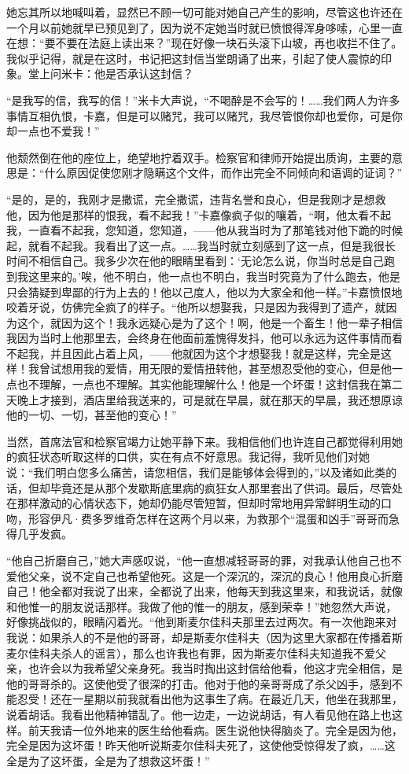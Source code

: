 \par 她忘其所以地喊叫着，显然已不顾一切可能对她自己产生的影响，尽管这也许还在一个月以前她就早已预见到了，因为说不定她当时就已愤恨得浑身哆嗦，心里一直在想：“要不要在法庭上读出来？”现在好像一块石头滚下山坡，再也收拦不住了。我似乎记得，就是在这时，书记把这封信当堂朗诵了出来，引起了使人震惊的印象。堂上问米卡：他是否承认这封信？
\par “是我写的信，我写的信！”米卡大声说，“不喝醉是不会写的！……我们两人为许多事情互相仇恨，卡嘉，但是可以赌咒，我可以赌咒，我尽管恨你却也爱你，可是你却一点也不爱我！”
\par 他颓然倒在他的座位上，绝望地拧着双手。检察官和律师开始提出质询，主要的意思是：“什么原因促使您刚才隐瞒这个文件，而作出完全不同倾向和语调的证词？”
\par “是的，是的，我刚才是撒谎，完全撒谎，违背名誉和良心，但是我刚才是想救他，因为他是那样的恨我，看不起我！”卡嘉像疯子似的嚷着，“啊，他太看不起我，一直看不起我，您知道，您知道，——他从我当时为了那笔钱对他下跪的时候起，就看不起我。我看出了这一点。……我当时就立刻感到了这一点，但是我很长时间不相信自己。我多少次在他的眼睛里看到：‘无论怎么说，你当时总是自己跑到我这里来的。’唉，他不明白，他一点也不明白，我当时究竟为了什么跑去，他是只会猜疑到卑鄙的行为上去的！他以己度人，他以为大家全和他一样。”卡嘉愤恨地咬着牙说，仿佛完全疯了的样子。“他所以想娶我，只是因为我得到了遗产，就因为这个，就因为这个！我永远疑心是为了这个！啊，他是一个畜生！他一辈子相信我因为当时上他那里去，会终身在他面前羞愧得发抖，他可以永远为这件事情而看不起我，并且因此占着上风，——他就因为这个才想娶我！就是这样，完全是这样！我曾试想用我的爱情，用无限的爱情扭转他，甚至想忍受他的变心，但是他一点也不理解，一点也不理解。其实他能理解什么！他是一个坏蛋！这封信我在第二天晚上才接到，酒店里给我送来的，可是就在早晨，就在那天的早晨，我还想原谅他的一切、一切，甚至他的变心！”
\par 当然，首席法官和检察官竭力让她平静下来。我相信他们也许连自己都觉得利用她的疯狂状态听取这样的口供，实在有点不好意思。我记得，我听见他们对她说：“我们明白您多么痛苦，请您相信，我们是能够体会得到的，”以及诸如此类的话，但却毕竟还是从那个发歇斯底里病的疯狂女人那里套出了供词。最后，尽管处在那样激动的心情状态下，她却仍能尽管短暂，但却时常地用异常鲜明生动的口吻，形容伊凡·费多罗维奇怎样在这两个月以来，为救那个“混蛋和凶手”哥哥而急得几乎发疯。
\par “他自己折磨自己，”她大声感叹说，“他一直想减轻哥哥的罪，对我承认他自己也不爱他父亲，说不定自己也希望他死。这是一个深沉的，深沉的良心！他用良心折磨自己！他全都对我说了出来，全都说了出来，他每天到我这里来，和我说话，就像和他惟一的朋友说话那样。我做了他的惟一的朋友，感到荣幸！”她忽然大声说，好像挑战似的，眼睛闪着光。“他到斯麦尔佳科夫那里去过两次。有一次他跑来对我说：如果杀人的不是他的哥哥，却是斯麦尔佳科夫（因为这里大家都在传播着斯麦尔佳科夫杀人的谣言），那么也许我也有罪，因为斯麦尔佳科夫知道我不爱父亲，也许会以为我希望父亲身死。我当时掏出这封信给他看，他这才完全相信，是他的哥哥杀的。这使他受了很深的打击。他对于他的亲哥哥成了杀父凶手，感到不能忍受！还在一星期以前我就看出他为这事生了病。在最近几天，他坐在我那里，说着胡话。我看出他精神错乱了。他一边走，一边说胡话，有人看见他在路上也这样。前天我请一位外地来的医生给他看病。医生说他快得脑炎了。完全是因为他，完全是因为这坏蛋！昨天他听说斯麦尔佳科夫死了，这使他受惊得发了疯，……这全是为了这坏蛋，全是为了想救这坏蛋！”

